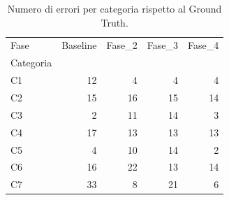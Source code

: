 \begin{table}
\caption{Numero di errori per categoria rispetto al Ground Truth.}
\label{tab:errori_categoria}
\begin{tabular}{lrrrr}
\toprule
Fase & Baseline & Fase_2 & Fase_3 & Fase_4 \\
Categoria &  &  &  &  \\
\midrule
C1 & 12 & 4 & 4 & 4 \\
C2 & 15 & 16 & 15 & 14 \\
C3 & 2 & 11 & 14 & 3 \\
C4 & 17 & 13 & 13 & 13 \\
C5 & 4 & 10 & 14 & 2 \\
C6 & 16 & 22 & 13 & 14 \\
C7 & 33 & 8 & 21 & 6 \\
\bottomrule
\end{tabular}
\end{table}
